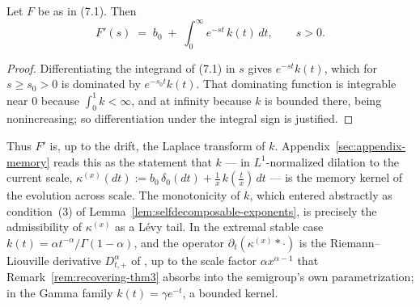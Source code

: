 \begin{lemma}\label{lem:memory-kernel}
Let $F$ be as in (7.1). Then
\[
  F'(s) \;=\; b_0 \;+\; \int_0^\infty e^{-st}\, k(t)\,dt, \qquad s > 0.
\]
\end{lemma}

\begin{proof}
Differentiating the integrand of (7.1) in $s$ gives $e^{-st}k(t)$, which for $s \ge s_0 > 0$ is
dominated by $e^{-s_0 t} k(t)$. That dominating function is integrable near $0$ because
$\int_0^1 k < \infty$, and at infinity because $k$ is bounded there, being nonincreasing; so
differentiation under the integral sign is justified.
\end{proof}

Thus $F'$ is, up to the drift, the Laplace transform of $k$. Appendix~\ref{sec:appendix-memory}
reads this as the statement that $k$ --- in $L^1$-normalized dilation to the current scale,
$\kappa^{(x)}(dt) := b_0\,\delta_0(dt) + \tfrac1x\,k(\tfrac tx)\,dt$ --- is the memory kernel
of the evolution across scale. The monotonicity of $k$, which entered abstractly as
condition~(3) of Lemma~\ref{lem:selfdecomposable-exponents}, is precisely the admissibility of
$\kappa^{(x)}$ as a Lévy tail. In the extremal stable case
$k(t) = \alpha t^{-\alpha}/\Gamma(1-\alpha)$, and the operator
$\partial_t(\kappa^{(x)} * \cdot)$ is the Riemann--Liouville derivative $D^{\alpha}_{t,+}$ of
, up to the scale factor $\alpha x^{\alpha-1}$ that
Remark~\ref{rem:recovering-thm3} absorbs into the semigroup's own parametrization; in the
Gamma family $k(t) = \gamma e^{-t}$, a bounded kernel.
